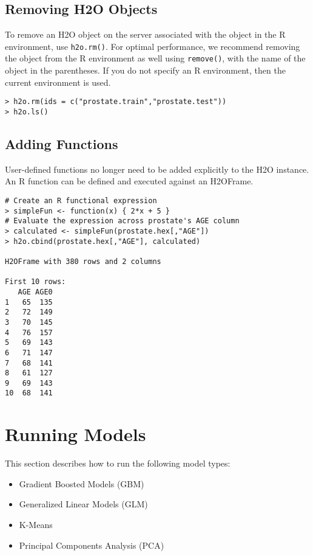 {{\normalsize 

\subsection{Removing H2O Objects}

To remove an H2O object on the server associated with the object in the R environment, use {\texttt{h2o.rm()}}. For optimal performance, we recommend removing the object from the R environment as well using {\texttt{remove()}}, with the name of the object in the parentheses. If you do not specify an R environment, then the current environment is used.
\begin{lstlisting}[style=R]
> h2o.rm(ids = c("prostate.train","prostate.test"))
> h2o.ls()
\end{lstlisting}

\subsection{Adding Functions}
User-defined functions no longer need to be added explicitly to the H2O instance. An R function can be defined and executed against an H2OFrame. 
\smallskip
\begin{lstlisting}[style=R]
# Create an R functional expression
> simpleFun <- function(x) { 2*x + 5 }
# Evaluate the expression across prostate's AGE column
> calculated <- simpleFun(prostate.hex[,"AGE"])
> h2o.cbind(prostate.hex[,"AGE"], calculated)

H2OFrame with 380 rows and 2 columns

First 10 rows:
   AGE AGE0
1   65  135
2   72  149
3   70  145
4   76  157
5   69  143
6   71  147
7   68  141
8   61  127
9   69  143
10  68  141
\end{lstlisting}


\section{Running Models}
\label{sec:RunModel}

This section describes how to run the following model types:

\begin{itemize}
\item Gradient Boosted Models (GBM)
\item Generalized Linear Models (GLM)
\item K-Means 
\item Principal Components Analysis (PCA)


\end{itemize}}}
